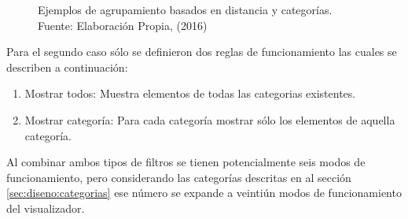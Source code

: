 \begin{figure}[H]
\centering
\captionsetup{justification=centering}
\hfill
{}
\caption[Ejemplos de agrupamiento basados en distancia y categorías.]{Ejemplos de agrupamiento basados en distancia y categorías.\\Fuente: Elaboración Propia, (2016)}
\label{fig:EjemploAmbosClusters}
\end{figure}

Para el segundo caso sólo se definieron dos reglas de funcionamiento las cuales se describen a continuación:

\begin{enumerate}
\item Mostrar todos: Muestra elementos de todas las categorias existentes.
\item Mostrar categoría: Para cada categoría mostrar sólo los elementos de aquella categoría. 
\end{enumerate}

Al combinar ambos tipos de filtros se tienen potencialmente seis modos de funcionamiento, pero considerando las categorías descritas en al sección \ref{sec:diseno:categorias} ese número se expande a veintiún modos de funcionamiento del visualizador.

